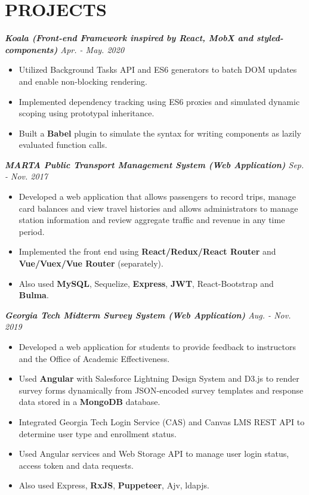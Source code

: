 \documentclass[10pt]{article}
\begin{document}
\section*{PROJECTS}
{\itshape {\bfseries Koala (Front-end Framework  inspired by React, MobX and styled-components)} \hfill Apr. - May. 2020}
\begin{itemize}[leftmargin=15pt, noitemsep, topsep=0pt]
\item Utilized Background Tasks API and ES6 generators to batch DOM updates and enable non-blocking rendering.
\item Implemented dependency tracking using ES6 proxies and simulated dynamic scoping using prototypal inheritance.
\item Built a \textbf{Babel} plugin to simulate the syntax for writing components as lazily evaluated function calls.
\end{itemize}
\vspace{0.5em}
%
{\itshape {\bfseries MARTA Public Transport Management System (Web Application)} \hfill Sep. - Nov. 2017}
\begin{itemize}[leftmargin=15pt, noitemsep, topsep=0pt]
\item Developed a web application that allows passengers to record trips, manage card balances and view travel histories and allows administrators to manage station information and review aggregate traffic and revenue in any time period.
\item Implemented the front end using \textbf{React/Redux/React Router} and \textbf{Vue/Vuex/Vue Router} (separately). 
\item Also used \textbf{MySQL}, Sequelize, \textbf{Express}, \textbf{JWT}, React-Bootstrap and \textbf{Bulma}.
\end{itemize}
\vspace{0.5em}
%
{\itshape {\bfseries Georgia Tech Midterm Survey System (Web Application)}  \hfill Aug. - Nov. 2019}
\begin{itemize}[leftmargin=15pt, noitemsep, topsep=0pt]
\item Developed a web application for students to provide feedback to instructors and the Office of Academic Effectiveness.
\item Used \textbf{Angular} with Salesforce Lightning Design System and D3.js to render survey forms dynamically from JSON-encoded survey templates and response data stored in a \textbf{MongoDB} database.
\item Integrated Georgia Tech Login Service (CAS) and Canvas LMS REST API to determine user type and enrollment status.
\item Used Angular services and Web Storage API to manage user login status, access token and data requests.
\item Also used Express, \textbf{RxJS}, \textbf{Puppeteer}, Ajv, ldapjs.
\end{itemize}
\end{document}

